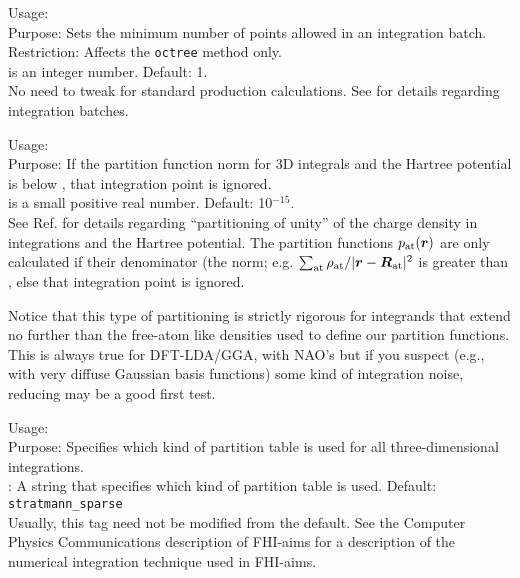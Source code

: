 {
  \noindent
  Usage:   \\[1.0ex]
  Purpose: Sets the minimum number of points allowed in an integration
  batch. \\[1.0ex]
  Restriction: Affects the \texttt{octree}
   method only. \\[1.0ex] 
   is an integer number. Default: 1. \\
}
No need to tweak for standard production calculations. See
 for details regarding integration
batches. 

{
  \noindent
  Usage:   \\[1.0ex]
  Purpose: If the partition function norm for 3D integrals and the
  Hartree potential is below , that integration
  point is ignored. \\[1.0ex]
   is a small positive real number. Default:
    10$^{-15}$. \\
}
See Ref. \cite{Blum08} for details regarding ``partitioning of unity''
of the charge density in integrations and the Hartree potential. 
The partition functions $p_\text{at}(\mbox{\boldmath$r$})$ are only
calculated if their denominator (the norm; e.g. $\sum_\text{at}
\rho_\text{at}/|\mbox{\boldmath$r$}-\mbox{\boldmath$R$}_\text{at}|^2$ is greater than ,
else that integration point is ignored.

Notice that this type of partitioning is strictly
rigorous for integrands that extend no further than the free-atom like
densities used to define our partition functions. This is always true
for DFT-LDA/GGA, with NAO's but if you suspect (e.g., with very diffuse
Gaussian basis functions) some kind of integration noise, reducing
 may be a good first test. 

{
  \noindent
  Usage:     \\[1.0ex]
  Purpose: Specifies which kind of partition table is used for all
    three-dimensional integrations. \\[1.0ex] 
   : A string that specifies which kind of partition
    table is used. Default: \texttt{stratmann\_sparse} \\ 
}
Usually, this tag need not be modified from the default. See the
Computer Physics Communications description of FHI-aims for a 
description of the numerical integration technique used in FHI-aims. 

